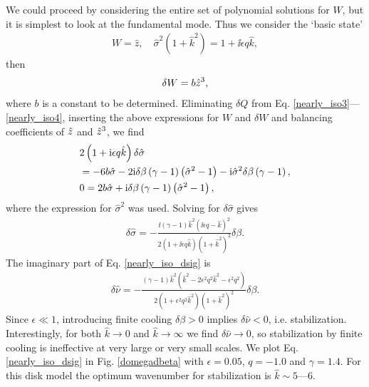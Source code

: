 We could proceed by considering the entire set of polynomial
solutions for $W$, but it is simplest to look at the fundamental
mode. Thus we consider the `basic state' 
\begin{align*}
  W = \hat{z},\quad \hat{\sigma}^2\left(1+\hat{k}^2\right) = 1 +
  \ii\epsilon q \hat{k},
\end{align*}
then
\begin{align}
  \delta W = b \hat{z}^3,
\end{align}
where $b$ is a constant to be determined. Eliminating $\delta Q$ from
Eq. \ref{nearly_iso3}---\ref{nearly_iso4}, inserting the above
expressions for $W$ and $\delta W$ and balancing coefficients of
$\hat{z}$ and $\hat{z}^3$, we find
\begin{align}
 & 2\left(1+\mathrm{i}\epsilon q \hat{k}\right) \delta\hat{\sigma} \notag\\& = -6b\hat{\sigma} -
2\mathrm{i} \delta \beta\left(\gamma-1\right)\left(\hat{\sigma}^2-1\right) - \mathrm{i}
  \hat{\sigma}^2\delta\beta\left(\gamma-1\right),\\
& 0=  2b\hat{\sigma}+\mathrm{i}\delta\beta
\left(\gamma-1\right)\left(\hat{\sigma}^2 - 1\right),
\end{align}
where the expression for $\hat{\sigma}^2$ was used. Solving for
$\delta\hat{\sigma}$ gives 
\begin{align}\label{nearly_iso_dsig}
  \delta \hat{\sigma} =
  -\frac{\ii\left(\gamma-1\right)\hat{k}^2\left(\ii\epsilon
    q - \hat{k}\right)^2}{2\left(1+\ii\epsilon q \hat{k}\right)\left(1+\hat{k}^2\right)^2}\delta\beta.
\end{align}
The imaginary part of Eq. \ref{nearly_iso_dsig} is
\begin{align}
   \delta\hat{\nu} =
  -\frac{\left(\gamma-1\right)\hat{k}^2 \left(\hat{k}^2 -
      2\epsilon^2q^2\hat{k}^2 - \epsilon^2q^2\right)}{2\left(1+\epsilon^2 q^2
        \hat{k}^2\right)\left(1+\hat{k}^2\right)^2}\delta\beta.  
\end{align}
Since $\epsilon \ll 1$, introducing finite cooling $\delta\beta>0$
implies $\delta\hat{\nu} < 0$, i.e. stabilization. Interestingly, for both
$\hat{k}\to0$ and $\hat{k}\to\infty$ we find $\delta\hat{\nu}\to0$, so
stabilization by finite cooling is ineffective at very large or very
small scales. We plot Eq. \ref{nearly_iso_dsig} in Fig. \ref{domegadbeta} with
$\epsilon=0.05$, $q=-1.0$ and $\gamma=1.4$. For this disk model the
optimum wavenumber for stabilization is $\hat{k}\sim 5$---$6$.  



